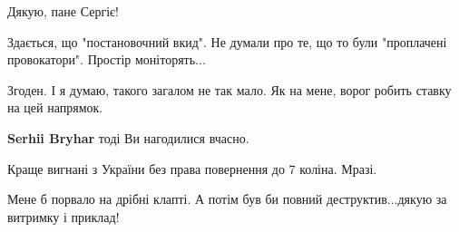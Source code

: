 \begin{itemize}
 
Дякую, пане Сергіє!

 
Здається, що "постановочний вкид". Не думали про те, що то були "проплачені провокатори". Простір моніторять...

\begin{itemize}
 
Згоден. І я думаю, такого загалом не так мало. Як на мене, ворог робить ставку на цей напрямок.

 
\textbf{Serhii Bryhar} тоді Ви нагодилися вчасно.
\end{itemize}

 
Краще вигнані з України без права повернення до 7 коліна.
Мразі.

 
Мене б порвало на дрібні клапті. А потім був би повний деструктив...дякую за витримку і приклад!


\end{itemize}
